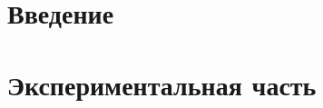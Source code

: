 



\def\labauthors{Карусевич А.А., Шиков А.П., Виноградов И.Д., Понур К.А.}
\def\labgroup{440}
\def\labnumber{1}
\def\labtheme{Синтез и реализация цифрового целочисленного фильтра на микроконтроллере}
\renewcommand{\vec}{\mathbf}
\renewcommand{\phi}{\varphi}
\renewcommand{\hat}{\widehat}



\section{Введение}
\section{Экспериментальная часть}


